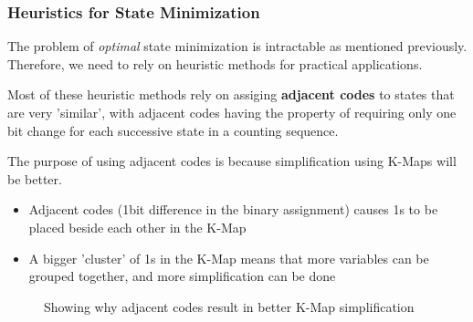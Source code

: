 \documentclass{article}
\begin{document}
\subsubsection{Heuristics for State Minimization}
The problem of \textit{optimal} state minimization is intractable as mentioned previously.
Therefore, we need to rely on heuristic methods for practical applications.

Most of these heuristic methods rely on assiging \textbf{adjacent codes} to states that are very 'similar',
with adjacent codes having the property of requiring only one bit change for each successive state in a counting sequence.

The purpose of using adjacent codes is because simplification using K-Maps will be better.
\begin{itemize}
    \item Adjacent codes (1bit difference in the binary assignment) causes 1s to be placed beside each other in the K-Map
    \item A bigger 'cluster' of 1s in the K-Map means that more variables can be grouped together, and more simplification can be done
\end{itemize}

\begin{figure}[htp]%
    \centering
    \qquad
    \caption{Showing why adjacent codes result in better K-Map simplification}%
\end{figure}
\end{document}
